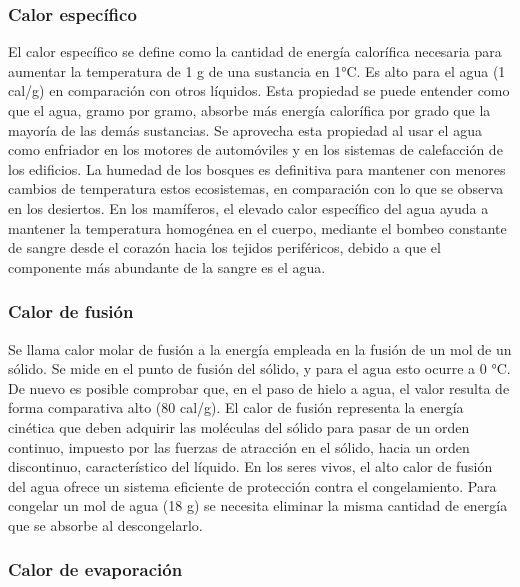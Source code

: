 \subsubsection{Calor específico}

El calor específico se define como la cantidad de energía calorífica necesaria para aumentar la temperatura de 1 g de una sustancia en 1°C. Es alto para el agua (1 cal/g) en comparación con otros líquidos. Esta propiedad se puede entender como que el agua, gramo por gramo, absorbe más energía calorífica por grado que la mayoría de las demás sustancias. Se aprovecha esta propiedad al usar el agua como enfriador en los motores de automóviles y en los sistemas de calefacción de los edificios. La humedad de los bosques es definitiva para mantener con menores cambios de temperatura estos ecosistemas, en comparación con lo que se observa en los desiertos. En los mamíferos, el elevado calor específico del agua ayuda a mantener la temperatura homogénea en el cuerpo, mediante el bombeo constante de sangre desde el corazón hacia los tejidos periféricos, debido a que el componente más abundante de la sangre es el agua.

\subsubsection{Calor de fusión}

Se llama calor molar de fusión a la energía empleada en la fusión de un mol de un sólido. Se mide en el punto de fusión del sólido, y para el agua esto ocurre a 0 °C. De nuevo es posible comprobar que, en el paso de hielo a agua, el valor resulta de forma comparativa alto (80 cal/g). El calor de fusión representa la energía cinética que deben adquirir las moléculas del sólido para pasar de un orden continuo, impuesto por las fuerzas de atracción en el sólido, hacia un orden discontinuo, característico del líquido. En los seres vivos, el alto calor de fusión del agua ofrece un sistema eficiente de protección contra el congelamiento. Para congelar un mol de agua (18 g) se necesita eliminar la misma cantidad de energía que se absorbe al descongelarlo.

\subsubsection{Calor de evaporación}

